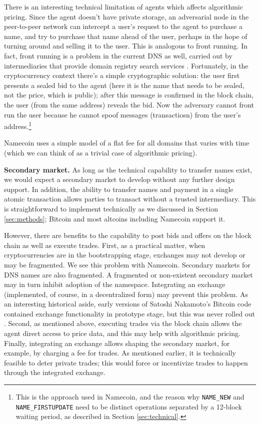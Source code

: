 There is an interesting technical limitation of agents which affects algorithmic pricing. Since the agent doesn't have private storage, an adversarial node in the peer-to-peer network can intercept a user's request to the agent to purchase a name, and try to purchase that name ahead of the user, perhaps in the hope of turning around and selling it to the user. This is analogous to front running. In fact, front running is a problem in the current DNS as well, carried out by intermediaries that provide domain registry search services \cite{}. Fortunately, in the cryptocurrency context there's a simple cryptographic solution: the user first presents a sealed bid to the agent (here it is the name that needs to be sealed, not the price, which is public); after this message is confirmed in the block chain, the user (from the same address) reveals the bid. Now the adversary cannot front run the user because he cannot spoof messages (transactiosn) from the user's address.\footnote{This is the approach used in Namecoin, and the reason why {\tt NAME\_NEW} and {\tt NAME\_FIRSTUPDATE} need to be distinct operations separated by a 12-block waiting period, as described in Section \ref{sec:technical}.}


Namecoin uses a simple model of a flat fee for all domains that varies with time (which we can think of as a trivial case of algorithmic pricing).

{\bf Secondary market.} As long as the technical capability to transfer names exist, we would expect a secondary market to develop without any further design support. In addition, the ability to transfer names and payment in a single atomic transaction allows parties to transact without a trusted intermediary. This is straightforward to implement technically as we discussed in Section \ref{sec:methods}; Bitcoin and most altcoins including Namecoin support it. 

However, there are benefits to the capability to post bids and offers on the block chain as well as execute trades. First, as a practical matter, when cryptocurrencies are in the bootstrapping stage, exchanges may not develop or may be fragmented. We see this problem with Namecoin. Secondary markets for DNS names are also fragmented. A fragmented or non-existent secondary market may in turn inhibit adoption of the namespace. Integrating an exchange (implemented, of course, in a decentralized form) may prevent this problem. As an interesting historical aside, early versions of Satoshi Nakamoto's Bitcoin code contained exchange functionality in prototype stage, but this was never rolled out \cite{bitcoin}.  Second, as mentioned above, executing trades via the block chain allows the agent direct access to price data, and this may help with algorithmic pricing. Finally, integrating an exchange allows shaping the secondary market, for example, by charging a fee for trades. As mentioned earlier, it is technically feasible to deter private trades; this would force or incentivize trades to happen through the integrated exchange.

